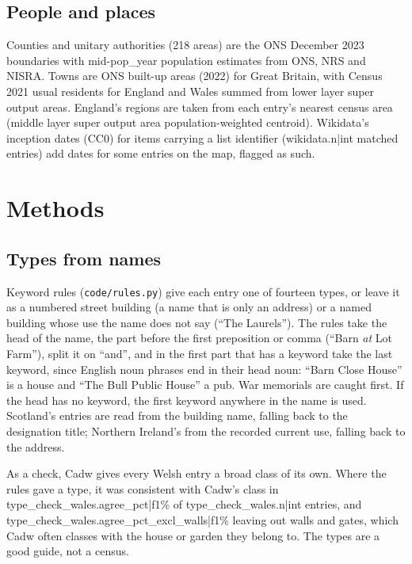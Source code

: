 \documentclass[11pt,a4paper]{article}
\begin{document}
\subsection{People and places}

Counties and unitary authorities (218 areas) are the ONS December 2023 boundaries with mid-{{pop_year}} population estimates from ONS, NRS and NISRA. Towns are ONS built-up areas (2022) for Great Britain, with Census 2021 usual residents for England and Wales summed from lower layer super output areas. England's regions are taken from each entry's nearest census area (middle layer super output area population-weighted centroid). Wikidata's inception dates (CC0) for items carrying a list identifier ({{wikidata.n|int}} matched entries) add dates for some entries on the map, flagged as such.

\section{Methods}

\subsection{Types from names}

Keyword rules (\texttt{code/rules.py}) give each entry one of fourteen types, or leave it as a numbered street building (a name that is only an address) or a named building whose use the name does not say (``The Laurels''). The rules take the head of the name, the part before the first preposition or comma (``Barn \textit{at} Lot Farm''), split it on ``and'', and in the first part that has a keyword take the last keyword, since English noun phrases end in their head noun: ``Barn Close House'' is a house and ``The Bull Public House'' a pub. War memorials are caught first. If the head has no keyword, the first keyword anywhere in the name is used. Scotland's entries are read from the building name, falling back to the designation title; Northern Ireland's from the recorded current use, falling back to the address.

As a check, Cadw gives every Welsh entry a broad class of its own. Where the rules gave a type, it was consistent with Cadw's class in {{type_check_wales.agree_pct|f1}}\% of {{type_check_wales.n|int}} entries, and {{type_check_wales.agree_pct_excl_walls|f1}}\% leaving out walls and gates, which Cadw often classes with the house or garden they belong to. The types are a good guide, not a census.
\end{document}
